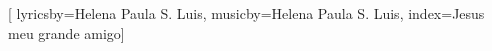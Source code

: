 


\setcounter{songnum}{80}

[
        lyricsby={Helena Paula S. Luis}, 
        musicby={Helena Paula S. Luis},
        index={Jesus meu grande amigo}]


